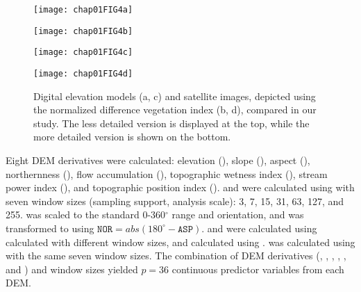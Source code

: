 






\begin{figure}[!ht]
  \centering
    \begin{minipage}[b]{63mm}
      \label{fig:dem-old}
      \centering
      \texttt{[image: chap01FIG4a]}
    \end{minipage}
    \begin{minipage}[b]{63mm}
      \label{fig:sat-old}
      \centering
      \texttt{[image: chap01FIG4b]}
    \end{minipage}
    \begin{minipage}[b]{63mm}
      \label{fig:dem-new}
      \centering
      \texttt{[image: chap01FIG4c]}
    \end{minipage}
    \begin{minipage}[b]{63mm}
      \label{fig:sat-new}
      \centering
      \texttt{[image: chap01FIG4d]}
    \end{minipage}
  \caption{Digital elevation models (a, c) and satellite images, depicted using 
  the normalized difference vegetation index (b, d), compared in our study. The
  less detailed version is displayed at the top, while the more detailed version
  is shown on the bottom.}
  \label{fig:con-covars}
\end{figure}

Eight DEM derivatives were calculated: elevation (\elev), slope (\slp), aspect 
(\asp), northernness (\nor), flow accumulation (\acc), topographic wetness index
(\twi), stream power index (\spi), and topographic position index (\tpi). \slp{}
and \asp{} were calculated using  with seven window sizes 
(sampling support, analysis scale): 3, 7, 15, 31, 63, 127, and 255. \asp{} was 
scaled to the standard 0-360$^\circ$ range and orientation, and was transformed
to \nor{} using $\texttt{NOR} = abs(180^\circ - \texttt{ASP})$. \twi{} and \spi{}
were calculated using \slp{} calculated with different window sizes, and \acc{} 
calculated using . \tpi{} was calculated using 
 with the same seven window sizes. The combination of DEM
derivatives (\elev, \slp, \nor, \twi, \spi, and \tpi) and window sizes yielded 
$p=36$ continuous predictor variables from each DEM.

